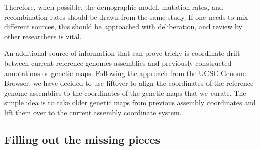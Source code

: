 \documentclass[hidelinks]{article}
\newcommand{\stdpopsim}{\texttt{stdpopsim}\xspace}
\begin{document}
%
Therefore, when possible, the demographic model, mutation rates,
and recombination rates should be drawn from the same study.
If one needs to mix different sources, this should be approached with deliberation,
and review by other researchers is vital.

An additional source of information that can prove tricky is coordinate drift between current
reference genomes assemblies and previously constructed annotations or genetic maps.
Following the approach from the UCSC Genome Browser, we have decided to use liftover
to align the coordinates of the reference genome assemblies to the coordinates of the
genetic maps that we curate. The simple idea is to take older genetic maps from
previous assembly coordinates and lift them over to the current assembly coordinate system.

\subsection*{Filling out the missing pieces}
\end{document}
